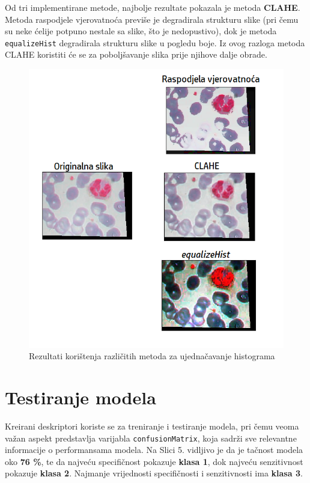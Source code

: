 \documentclass[12pt,a4paper]{article}
\begin{document}
Od tri implementirane metode, najbolje rezultate pokazala je metoda \textbf{CLAHE}. Metoda raspodjele vjerovatnoća previše je degradirala strukturu slike (pri čemu su neke ćelije potpuno nestale sa slike, što je nedopustivo), dok je metoda \texttt{equalizeHist} degradirala strukturu slike u pogledu boje. Iz ovog razloga metoda CLAHE koristiti će se za poboljšavanje slika prije njihove dalje obrade.

\begin{figure}[H]

\center
\includegraphics[scale=0.9]{slikaHistogram.png}
\caption{Rezultati korištenja različitih metoda za ujednačavanje histograma}
	
\end{figure}

\newpage

\section{Testiranje modela}

Kreirani deskriptori koriste se za treniranje i testiranje modela, pri čemu veoma važan aspekt predstavlja varijabla \texttt{confusionMatrix}, koja sadrži sve relevantne informacije o performansama modela. Na Slici 5. vidljivo je da je tačnost modela oko \textbf{76 \%}, te da najveću specifičnost pokazuje \textbf{klasa 1}, dok najveću senzitivnost pokazuje \textbf{klasa 2}. Najmanje vrijednosti specifičnosti i senzitivnosti ima \textbf{klasa 3}.
\end{document}
